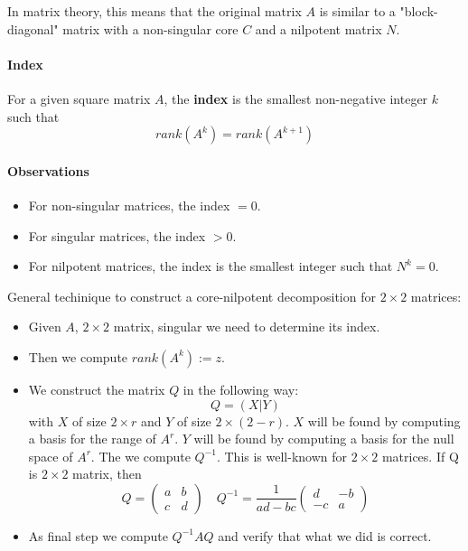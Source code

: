 In matrix theory, this means that the original matrix \( A \) is similar to a "block-diagonal" matrix with a non-singular core \( C \) and a nilpotent matrix \( N \).


\paragraph{Index}
For a given square matrix \( A \), the \textbf{index} is the smallest non-negative integer \( k \) such that
\[
rank(A^k) = rank(A^{k+1})
\]

\paragraph{Observations}
\begin{itemize}
    \item For non-singular matrices, the index \( = 0 \).
    \item For singular matrices, the index \( > 0 \).
    \item For nilpotent matrices, the index is the smallest integer such that \( N^k = 0 \).
\end{itemize}

General techinique to construct a core-nilpotent decomposition for $2 \times 2$ matrices:
\begin{itemize}
    \item Given $A$, $2 \times 2$ matrix, singular we need to determine its index.
    \item Then we compute $rank(A^k) := z$.
    \item We construct the matrix $Q$ in the following way:
    \[
        Q = \left(X | Y\right)
    \]
    with $X$ of size $2 \times r$ and $Y$ of size $2 \times (2 - r)$.
    $X$ will be found by computing a basis for the range of $A^r$.
    $Y$ will be found by computing a basis for the null space of $A^r$.
    The we compute $Q^{-1}$. This is well-known for $2 \times 2$ matrices.
    If Q is $2 \times 2$ matrix, then
    $$ Q = \begin{pmatrix} a & b \\ c & d \end{pmatrix} \quad Q^{-1} = \frac{1}{ad - bc} \begin{pmatrix} d & -b \\ -c & a \end{pmatrix} $$
    \item As final step we compute $Q^{-1} A Q$ and verify that what we did is correct.
\end{itemize}

